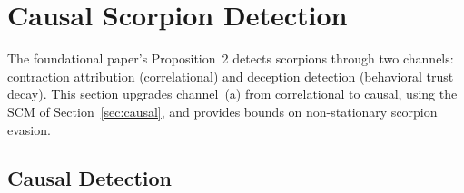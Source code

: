 \section{Causal Scorpion Detection}
\label{sec:scorpion}

The foundational paper's Proposition~2 \citep{lasser2026gfm} detects
scorpions through two channels: contraction attribution (correlational) and
deception detection (behavioral trust decay). This section upgrades
channel~(a) from correlational to causal, using the SCM of
Section~\ref{sec:causal}, and provides bounds on non-stationary scorpion
evasion.

\subsection{Causal Detection}

